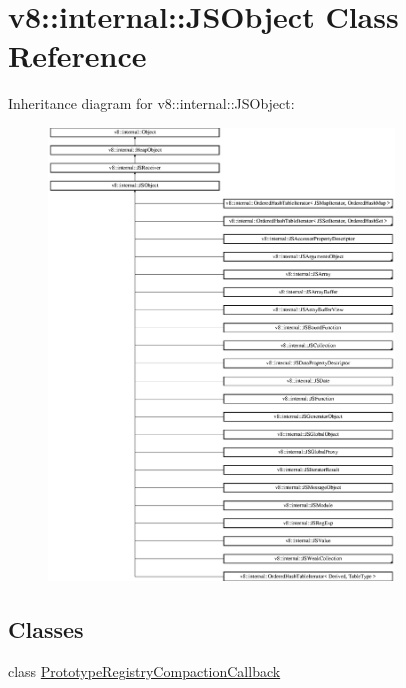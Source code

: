 \hypertarget{classv8_1_1internal_1_1_j_s_object}{}\section{v8\+:\+:internal\+:\+:J\+S\+Object Class Reference}
\label{classv8_1_1internal_1_1_j_s_object}
Inheritance diagram for v8\+:\+:internal\+:\+:J\+S\+Object\+:\begin{figure}[H]
\begin{center}
\leavevmode
\includegraphics[height=12.000000cm]{classv8_1_1internal_1_1_j_s_object}
\end{center}
\end{figure}
\subsection*{Classes}
\begin{DoxyCompactItemize}
\item 
class \hyperlink{classv8_1_1internal_1_1_j_s_object_1_1_prototype_registry_compaction_callback}{Prototype\+Registry\+Compaction\+Callback}
\end{DoxyCompactItemize}
